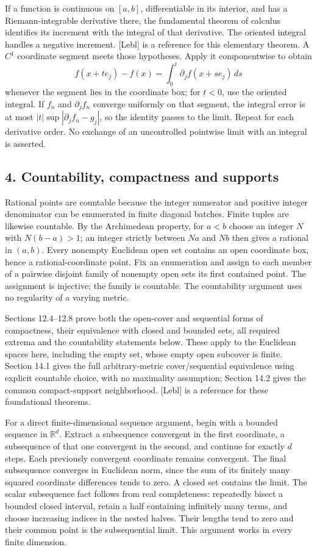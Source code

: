 \documentclass[
  11pt,
]{article}
\begin{document}
If a function is continuous on \([a,b]\), differentiable in its
interior, and has a Riemann-integrable derivative there, the fundamental
theorem of calculus identifies its increment with the integral of that
derivative. The oriented integral handles a negative increment.
{[}Lebl{]} is a reference for this elementary theorem. A \(C^1\)
coordinate segment meets those hypotheses. Apply it componentwise to
obtain \[
f(x+t e_j)-f(x)=\int_0^t\partial_j f(x+s e_j)\,ds
\] whenever the segment lies in the coordinate box; for \(t<0\), use the
oriented integral. If \(f_n\) and \(\partial_jf_n\) converge uniformly
on that segment, the integral error is at most
\(|t|\sup|\partial_jf_n-g_j|\), so the identity passes to the limit.
Repeat for each derivative order. No exchange of an uncontrolled
pointwise limit with an integral is asserted.

\subsection{4. Countability, compactness and
supports}\label{countability-compactness-and-supports}

Rational points are countable because the integer numerator and positive
integer denominator can be enumerated in finite diagonal batches. Finite
tuples are likewise countable. By the Archimedean property, for \(a<b\)
choose an integer \(N\) with \(N(b-a)>1\); an integer strictly between
\(Na\) and \(Nb\) then gives a rational in \((a,b)\). Every nonempty
Euclidean open set contains an open coordinate box, hence a
rational-coordinate point. Fix an enumeration and assign to each member
of a pairwise disjoint family of nonempty open sets its first contained
point. The assignment is injective; the family is countable. The
countability argument uses no regularity of a varying metric.

Sections 12.4--12.8 prove both the open-cover and sequential forms of
compactness, their equivalence with closed and bounded sets, all
required extrema and the countability statements below. These apply to
the Euclidean spaces here, including the empty set, whose empty open
subcover is finite. Section 14.1 gives the full arbitrary-metric
cover/sequential equivalence using explicit countable choice, with no
maximality assumption; Section 14.2 gives the common compact-support
neighborhood. {[}Lebl{]} is a reference for these foundational theorems.

For a direct finite-dimensional sequence argument, begin with a bounded
sequence in \(\mathbb R^d\). Extract a subsequence convergent in the
first coordinate, a subsequence of that one convergent in the second,
and continue for exactly \(d\) steps. Each previously convergent
coordinate remains convergent. The final subsequence converges in
Euclidean norm, since the sum of its finitely many squared coordinate
differences tends to zero. A closed set contains the limit. The scalar
subsequence fact follows from real completeness: repeatedly bisect a
bounded closed interval, retain a half containing infinitely many terms,
and choose increasing indices in the nested halves. Their lengths tend
to zero and their common point is the subsequential limit. This argument
works in every finite dimension.
\end{document}
